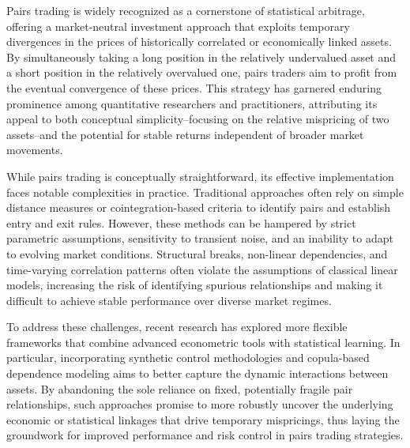 


Pairs trading is widely recognized as a cornerstone of statistical arbitrage, offering a market-neutral investment approach that exploits temporary divergences in the prices of historically correlated or economically linked assets.
%
%
By simultaneously taking a long position in the relatively undervalued asset and a short position in the relatively overvalued one, pairs traders aim to profit from the eventual convergence of these prices. This strategy has garnered enduring prominence among quantitative researchers and practitioners, attributing its appeal to both conceptual simplicity--focusing on the relative mispricing of two assets--and the potential for stable returns independent of broader market movements.


While pairs trading is conceptually straightforward, its effective implementation faces notable complexities in practice. Traditional approaches often rely on simple distance measures or cointegration-based criteria to identify pairs and establish entry and exit rules. However, these methods can be hampered by strict parametric assumptions, sensitivity to transient noise, and an inability to adapt to evolving market conditions. Structural breaks, non-linear dependencies, and time-varying correlation patterns often violate the assumptions of classical linear models, increasing the risk of identifying spurious relationships and making it difficult to achieve stable performance over diverse market regimes.

To address these challenges, recent research has explored more flexible frameworks that combine advanced econometric tools with statistical learning. In particular, incorporating synthetic control methodologies and copula-based dependence modeling aims to better capture the dynamic interactions between assets. By abandoning the sole reliance on fixed, potentially fragile pair relationships, such approaches promise to more robustly uncover the underlying economic or statistical linkages that drive temporary mispricings, thus laying the groundwork for improved performance and risk control in pairs trading strategies.


